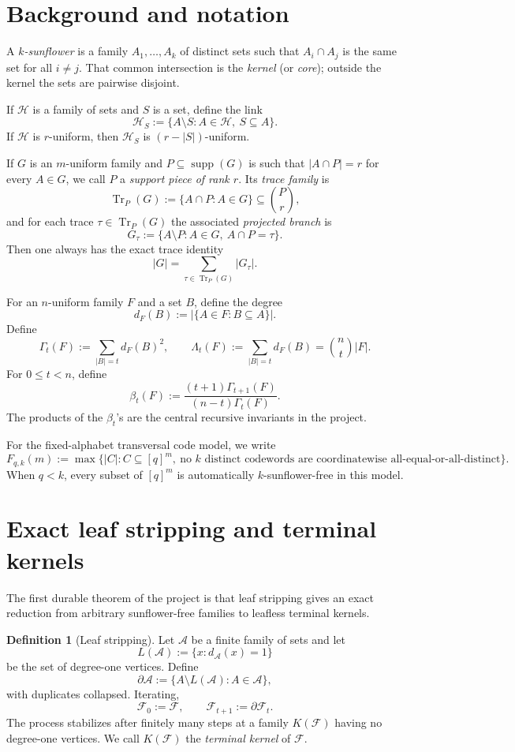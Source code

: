 \documentclass[11pt]{article}
\theoremstyle{definition}
\newtheorem{definition}[theorem]{Definition}
\newcommand{\Hh}{\mathcal{H}}
\newcommand{\Tr}{\operatorname{Tr}}
\newcommand{\supp}{\operatorname{supp}}
\newcommand{\1}{\mathbf{1}}
\begin{document}
\section{Background and notation}\label{sec:notation}
A \emph{$k$-sunflower} is a family $A_1,\dots,A_k$ of distinct sets such that $A_i\cap A_j$ is the same set for all $i\neq j$.
That common intersection is the \emph{kernel} (or \emph{core}); outside the kernel the sets are pairwise disjoint.

If $\Hh$ is a family of sets and $S$ is a set, define the link
\[
\Hh_S:=\{A\setminus S: A\in\Hh,\ S\subseteq A\}.
\]
If $\Hh$ is $r$-uniform, then $\Hh_S$ is $(r-|S|)$-uniform.

If $G$ is an $m$-uniform family and $P\subseteq \supp(G)$ is such that $|A\cap P|=r$ for every $A\in G$, we call $P$ a \emph{support piece of rank $r$}. Its \emph{trace family} is
\[
\Tr_P(G):=\{A\cap P: A\in G\}\subseteq \binom{P}{r},
\]
and for each trace $\tau\in \Tr_P(G)$ the associated \emph{projected branch} is
\[
G_\tau:=\{A\setminus P: A\in G,\ A\cap P=\tau\}.
\]
Then one always has the exact trace identity
\[
|G|=\sum_{\tau\in \Tr_P(G)} |G_\tau|.
\]

For an $n$-uniform family $F$ and a set $B$, define the degree
\[
d_F(B):=|\{A\in F:B\subseteq A\}|.
\]
Define
\[
\Gamma_t(F):=\sum_{|B|=t} d_F(B)^2,
\qquad
\Lambda_t(F):=\sum_{|B|=t} d_F(B)=\binom{n}{t}|F|.
\]
For $0\le t<n$, define
\[
\beta_t(F):=\frac{(t+1)\Gamma_{t+1}(F)}{(n-t)\Gamma_t(F)}.
\]
The products of the $\beta_t$'s are the central recursive invariants in the project.

For the fixed-alphabet transversal code model, we write
\[
F_{q,k}(m):=\max\{|C|: C\subseteq [q]^m,\ \text{no }k\text{ distinct codewords are coordinatewise all-equal-or-all-distinct}\}.
\]
When $q<k$, every subset of $[q]^m$ is automatically $k$-sunflower-free in this model.

\section{Exact leaf stripping and terminal kernels}\label{sec:leaf-stripping}
The first durable theorem of the project is that leaf stripping gives an exact reduction from arbitrary sunflower-free families to leafless terminal kernels.

\begin{definition}[Leaf stripping]
Let $\mathcal A$ be a finite family of sets and let
\[
L(\mathcal A):=\{x: d_{\mathcal A}(x)=1\}
\]
be the set of degree-one vertices.
Define
\[
\partial \mathcal A:=\{A\setminus L(\mathcal A): A\in \mathcal A\},
\]
with duplicates collapsed. Iterating,
\[
\mathcal F_0:=\mathcal F,
\qquad
\mathcal F_{t+1}:=\partial \mathcal F_t.
\]
The process stabilizes after finitely many steps at a family $K(\mathcal F)$ having no degree-one vertices. We call $K(\mathcal F)$ the \emph{terminal kernel} of $\mathcal F$.
\end{definition}
\end{document}
